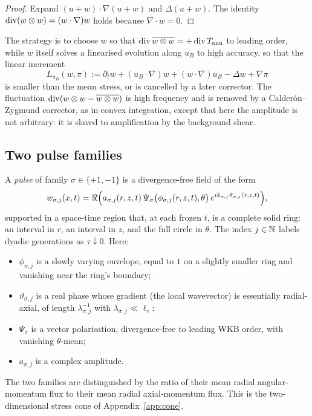 \begin{proof}
Expand $(u+w)\cdot\nabla(u+w)$ and $\Delta(u+w)$. The identity $\operatorname{div}(w\otimes w)=(w\cdot\nabla)w$ holds because $\nabla\cdot w=0$.
\end{proof}

The strategy is to choose $w$ so that $\operatorname{div}\overline{w\otimes w}=+\operatorname{div} T_{\mathrm{ann}}$ to leading order, while $w$ itself solves a linearised evolution along $u_B$ to high accuracy, so that the linear increment
\[
L_{u_B}(w,\pi):=\partial_t w+(u_B\cdot\nabla)w+(w\cdot\nabla)u_B-\Delta w+\nabla\pi
\]
is smaller than the mean stress, or is cancelled by a later corrector. The fluctuation $\operatorname{div}(w\otimes w-\overline{w\otimes w})$ is high frequency and is removed by a {C}alder{\'o}n--{Z}ygmund corrector, as in convex integration, except that here the amplitude is not arbitrary: it is slaved to amplification by the background shear.

\subsection{Two pulse families}
\label{sec:pulses}

\begin{construction}
\label{con:pulses}
A \emph{pulse} of family $\sigma\in\{+1,-1\}$ is a divergence-free field of the form
\begin{equation}
\label{eq:pulse}
w_{\sigma,j}(x,t)
=\Re\Bigl(
a_{\sigma,j}(r,z,t)\,
\Psi_\sigma\bigl(\phi_{\sigma,j}(r,z,t),\theta\bigr)
\,e^{i k_{\sigma,j}\vartheta_{\sigma,j}(r,z,t)}
\Bigr),
\end{equation}
supported in a space-time region that, at each frozen $t$, is a complete solid ring: an interval in $r$, an interval in $z$, and the full circle in $\theta$. The index $j\in\mathbb{N}$ labels dyadic generations as $\tau\downarrow 0$. Here:
\begin{itemize}[leftmargin=1.2em]
\item $\phi_{\sigma,j}$ is a slowly varying envelope, equal to $1$ on a slightly smaller ring and vanishing near the ring's boundary;
\item $\vartheta_{\sigma,j}$ is a real phase whose gradient (the local wavevector) is essentially radial-axial, of length $\lambda_{\sigma,j}^{-1}$ with $\lambda_{\sigma,j}\ll \ell_r$;
\item $\Psi_\sigma$ is a vector polarisation, divergence-free to leading WKB order, with vanishing $\theta$-mean;
\item $a_{\sigma,j}$ is a complex amplitude.
\end{itemize}
The two families are distinguished by the ratio of their mean radial angular-momentum flux to their mean radial axial-momentum flux. This is the two-dimensional stress cone of Appendix~\ref{app:cone}.
\end{construction}

